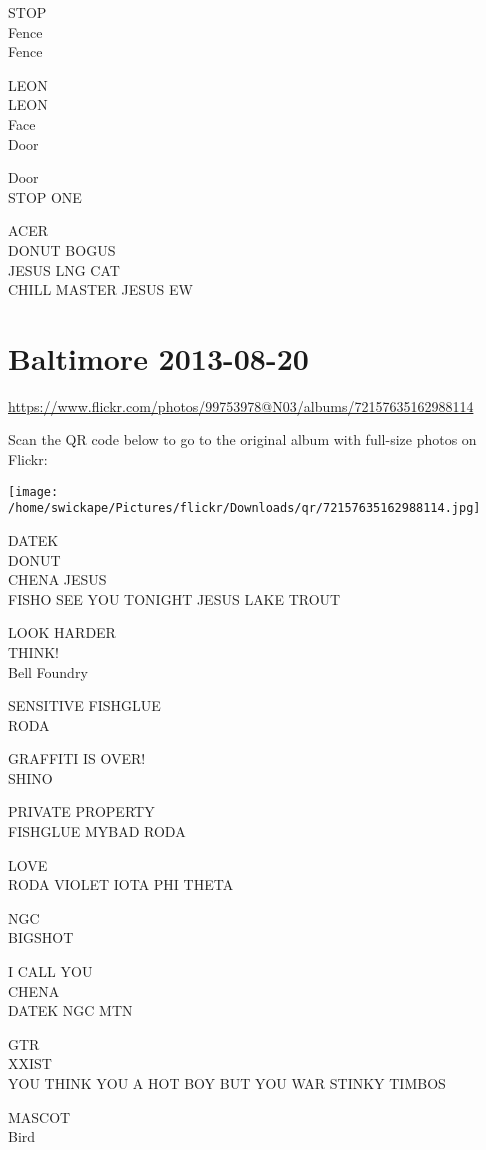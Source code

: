 \documentclass[10pt,letterpaper]{article}
\begin{document}
STOP\\
Fence\\
Fence

LEON\\
LEON\\
Face\\
Door

Door\\
STOP ONE

ACER\\
DONUT BOGUS\\
JESUS LNG CAT\\
CHILL MASTER JESUS EW
\pagebreak

\section*{Baltimore 2013-08-20}

\url{https://www.flickr.com/photos/99753978@N03/albums/72157635162988114}

Scan the QR code below to go to the original album with full-size photos on Flickr:

\texttt{[image: /home/swickape/Pictures/flickr/Downloads/qr/72157635162988114.jpg]}
\pagebreak

DATEK\\
DONUT\\
CHENA JESUS\\
FISHO SEE YOU TONIGHT JESUS LAKE TROUT

LOOK HARDER\\
THINK!\\
Bell Foundry

SENSITIVE FISHGLUE\\
RODA

GRAFFITI IS OVER!\\
SHINO

PRIVATE PROPERTY\\
FISHGLUE MYBAD RODA

LOVE\\
RODA VIOLET IOTA PHI THETA

NGC\\
BIGSHOT

I CALL YOU\\
CHENA\\
DATEK NGC MTN

GTR\\
XXIST\\
YOU THINK YOU A HOT BOY BUT YOU WAR STINKY TIMBOS

MASCOT\\
Bird
\end{document}
